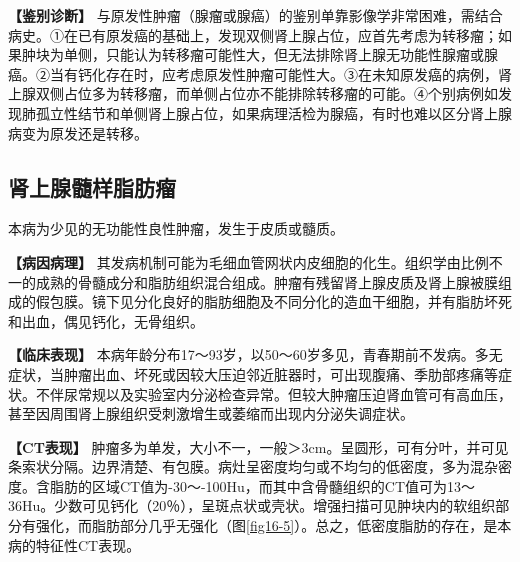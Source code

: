 \textbf{【鉴别诊断】}
与原发性肿瘤（腺瘤或腺癌）的鉴别单靠影像学非常困难，需结合病史。①在已有原发癌的基础上，发现双侧肾上腺占位，应首先考虑为转移瘤；如果肿块为单侧，只能认为转移瘤可能性大，但无法排除肾上腺无功能性腺瘤或腺癌。②当有钙化存在时，应考虑原发性肿瘤可能性大。③在未知原发癌的病例，肾上腺双侧占位多为转移瘤，而单侧占位亦不能排除转移瘤的可能。④个别病例如发现肺孤立性结节和单侧肾上腺占位，如果病理活检为腺癌，有时也难以区分肾上腺病变为原发还是转移。

\subsection{肾上腺髓样脂肪瘤}

本病为少见的无功能性良性肿瘤，发生于皮质或髓质。

\textbf{【病因病理】}
其发病机制可能为毛细血管网状内皮细胞的化生。组织学由比例不一的成熟的骨髓成分和脂肪组织混合组成。肿瘤有残留肾上腺皮质及肾上腺被膜组成的假包膜。镜下见分化良好的脂肪细胞及不同分化的造血干细胞，并有脂肪坏死和出血，偶见钙化，无骨组织。

\textbf{【临床表现】}
本病年龄分布17～93岁，以50～60岁多见，青春期前不发病。多无症状，当肿瘤出血、坏死或因较大压迫邻近脏器时，可出现腹痛、季肋部疼痛等症状。不伴尿常规以及实验室内分泌检查异常。但较大肿瘤压迫肾血管可有高血压，甚至因周围肾上腺组织受刺激增生或萎缩而出现内分泌失调症状。

\textbf{【CT表现】}
肿瘤多为单发，大小不一，一般＞3cm。呈圆形，可有分叶，并可见条索状分隔。边界清楚、有包膜。病灶呈密度均匀或不均匀的低密度，多为混杂密度。含脂肪的区域CT值为-30～-100Hu，而其中含骨髓组织的CT值可为13～36Hu。少数可见钙化（20％），呈斑点状或壳状。增强扫描可见肿块内的软组织部分有强化，而脂肪部分几乎无强化（图\ref{fig16-5}）。总之，低密度脂肪的存在，是本病的特征性CT表现。

